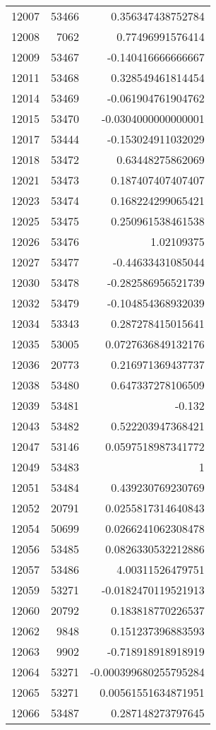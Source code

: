 \begin{tabular}{r | r | r}
12007 & 53466 & 0.356347438752784 \\
12008 & 7062 & 0.77496991576414 \\
12009 & 53467 & -0.140416666666667 \\
12011 & 53468 & 0.328549461814454 \\
12014 & 53469 & -0.061904761904762 \\
12015 & 53470 & -0.0304000000000001 \\
12017 & 53444 & -0.153024911032029 \\
12018 & 53472 & 0.63448275862069 \\
12021 & 53473 & 0.187407407407407 \\
12023 & 53474 & 0.168224299065421 \\
12025 & 53475 & 0.250961538461538 \\
12026 & 53476 & 1.02109375 \\
12027 & 53477 & -0.44633431085044 \\
12030 & 53478 & -0.282586956521739 \\
12032 & 53479 & -0.104854368932039 \\
12034 & 53343 & 0.287278415015641 \\
12035 & 53005 & 0.0727636849132176 \\
12036 & 20773 & 0.216971369437737 \\
12038 & 53480 & 0.647337278106509 \\
12039 & 53481 & -0.132 \\
12043 & 53482 & 0.522203947368421 \\
12047 & 53146 & 0.0597518987341772 \\
12049 & 53483 & 1 \\
12051 & 53484 & 0.439230769230769 \\
12052 & 20791 & 0.0255817314640843 \\
12054 & 50699 & 0.0266241062308478 \\
12056 & 53485 & 0.0826330532212886 \\
12057 & 53486 & 4.00311526479751 \\
12059 & 53271 & -0.0182470119521913 \\
12060 & 20792 & 0.183818770226537 \\
12062 & 9848 & 0.151237396883593 \\
12063 & 9902 & -0.718918918918919 \\
12064 & 53271 & -0.000399680255795284 \\
12065 & 53271 & 0.00561551634871951 \\
12066 & 53487 & 0.287148273797645 \\

\end{tabular}
